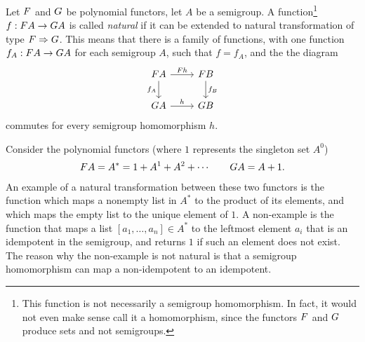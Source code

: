 \begin{definition}\label{def:natural-functions}
    Let $\functor$  and $\functorg$ be polynomial functors, let $A$ be a semigroup. A function\footnote{This function is not necessarily a semigroup homomorphism. In fact, it would not even make sense call it a homomorphism, since the functors $\functor$ and $\functorg$ produce sets and not semigroups.}  $f : \functor A \to \functorg A$ is called \emph{natural} if it can be extended to natural transformation of type $\functor \Rightarrow \functorg$. This means that there is a family of functions, with one function
    $
    f_A : \functor A \to \functorg A
    $
    for each semigroup $A$, such  that $f=f_A$, and the the  diagram
    \[
    \begin{tikzcd}
    \functor A 
    \ar[r,"\functor h"]
    \ar[d,"f_A"']
    & 
    \functor B 
    \ar[d,"f_B"]
    \\
    \functorg A 
    \ar[r,"h"]
    &
    \functorg B
    \end{tikzcd}
    \]
    commutes for every semigroup homomorphism $h$.
\end{definition}


\begin{example}
    Consider the polynomial functors (where $1$ represents the singleton set $A^0$)
    \begin{align*}
    \functor A = A^* = 1 + A^1 + A^2 + \cdots  \qquad \functorg A = A + 1.     \end{align*} 
An example of a natural transformation between these two functors is the function which maps a nonempty list in $A^*$ to the product of its elements, and which maps the empty list to the unique element of $1$. A non-example is the function that maps a list $[a_1,\ldots,a_n] \in A^*$ to the leftmost element $a_i$ that is an idempotent in the semigroup, and returns $1$ if such an element does not exist. The reason why the non-example is not natural is that a semigroup homomorphism can map a non-idempotent to an idempotent.
\end{example}


